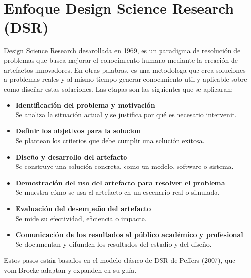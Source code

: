 \section{Enfoque Design Science Research (DSR)}
Design Science Research desarollada en 1969, es un paradigma de resolución de problemas que busca mejorar el 
conocimiento humano mediante la creación de artefactos innovadores. \cite{vomBrocke2020} En otras palabras, es una metodologa que crea soluciones a problemas  reales y al mismo tiempo generar
conocimiento util y aplicable sobre como diseñar estas soluciones. Las etapas son las siguientes que se aplicaran: 
\begin{itemize}[align=left, label=--]
    \item \textbf{Identificación del problema y motivación} \\
    Se analiza la situación actual y se justifica por qué es necesario intervenir.
    \item \textbf{Definir los objetivos para la solucion}\\
    Se plantean los criterios que debe cumplir una solución exitosa.
    \item \textbf{Diseño y desarrollo del artefacto}\\
    Se construye una solución concreta, como un modelo, software o sistema.
    \item \textbf{Demostración del uso del artefacto para resolver el problema}\\
    Se muestra cómo se usa el artefacto en un escenario real o simulado.
    \item \textbf{Evaluación del desempeño del artefacto}\\
    Se mide su efectividad, eficiencia o impacto.
    \item \textbf{Comunicación de los resultados al público académico y profesional}\\
    Se documentan y difunden los resultados del estudio y del diseño.
\end{itemize}
Estos pasos están basados en el modelo clásico de DSR de Peffers (2007), que vom Brocke adaptan y expanden en su guía.

